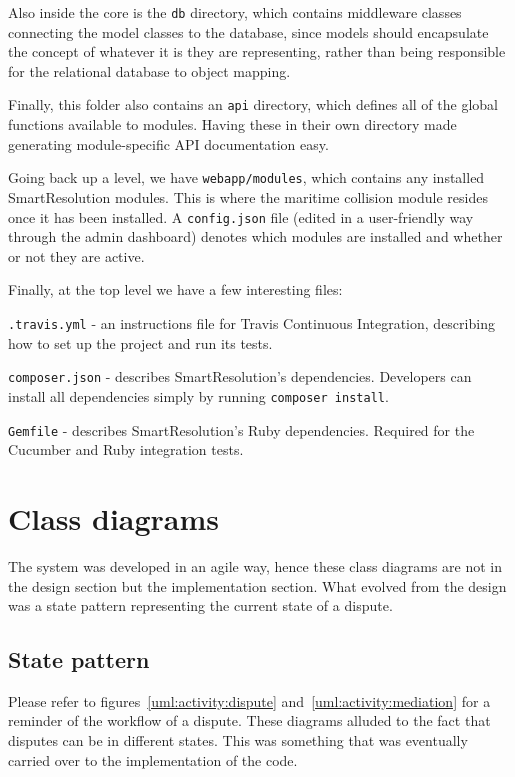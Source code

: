 Also inside the core is the \lstinline{db} directory, which contains middleware classes connecting the model classes to the database, since models should encapsulate the concept of whatever it is they are representing, rather than being responsible for the relational database to object mapping.

Finally, this folder also contains an \lstinline{api} directory, which defines all of the global functions available to modules. Having these in their own directory made generating module-specific API documentation easy.

Going back up a level, we have \lstinline{webapp/modules}, which contains any installed SmartResolution modules. This is where the maritime collision module resides once it has been installed. A \lstinline{config.json} file (edited in a user-friendly way through the admin dashboard) denotes which modules are installed and whether or not they are active.

Finally, at the top level we have a few interesting files:

\lstinline{.travis.yml} - an instructions file for Travis Continuous Integration, describing how to set up the project and run its tests.

\lstinline{composer.json} - describes SmartResolution's dependencies. Developers can install all dependencies simply by running \lstinline{composer install}.

\lstinline{Gemfile} - describes SmartResolution's Ruby dependencies. Required for the Cucumber and Ruby integration tests.

\section{Class diagrams}

The system was developed in an agile way, hence these class diagrams are not in the design section but the implementation section. What evolved from the design was a state pattern representing the current state of a dispute.

\subsection{State pattern}

Please refer to figures~\ref{uml:activity:dispute} and~\ref{uml:activity:mediation} for a reminder of the workflow of a dispute. These diagrams alluded to the fact that disputes can be in different states. This was something that was eventually carried over to the implementation of the code.

